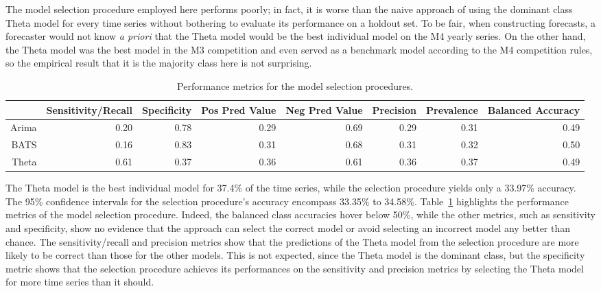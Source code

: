 \documentclass[11pt,3p,review,authoryear]{elsarticle}
\begin{document}
The model selection procedure employed here performs poorly; in fact, it is worse than the naive approach of using the dominant class Theta model for every time series without bothering to evaluate its performance on a holdout set. To be fair, when constructing forecasts, a forecaster would not know \textit{a priori} that the Theta model would be the best individual model on the M4 yearly series. On the other hand, the Theta model was the best model in the M3 competition and even served as a benchmark model according to the M4 competition rules, so the empirical result that it is the majority class here is not surprising.

\begin{table}[ht]
\centering
\caption{Performance metrics for the model selection procedures.}\label{tab:b}
\begin{adjustbox}{width=1\textwidth}
\begin{tabular}{rrrrrrrr}
  \hline
 & Sensitivity/Recall & Specificity & Pos Pred Value & Neg Pred Value & Precision & Prevalence & Balanced Accuracy \\
  \hline
Arima & 0.20 & 0.78 & 0.29 & 0.69 & 0.29 & 0.31 & 0.49 \\
  BATS & 0.16 & 0.83 & 0.31 & 0.68 & 0.31 & 0.32 & 0.50 \\
  Theta & 0.61 & 0.37 & 0.36 & 0.61 & 0.36 & 0.37 & 0.49 \\
   \hline
\end{tabular}
\end{adjustbox}
\end{table}

The Theta model is the best individual model for 37.4\% of the time series, while the selection procedure yields only a 33.97\% accuracy. The 95\% confidence intervals for the selection procedure's accuracy encompass 33.35\% to 34.58\%. Table~\ref{tab:b} highlights the performance metrics of the model selection procedure. Indeed, the balanced class accuracies hover below 50\%, while the other metrics, such as sensitivity and specificity, show no evidence that the approach can select the correct model or avoid selecting an incorrect model any better than chance. The sensitivity/recall and precision metrics show that the predictions of the Theta model from the selection procedure are more likely to be correct than those for the other models. This is not expected, since the Theta model is the dominant class, but the specificity metric shows that the selection procedure achieves its performances on the sensitivity and precision metrics by selecting the Theta model for more time series than it should.
\end{document}
